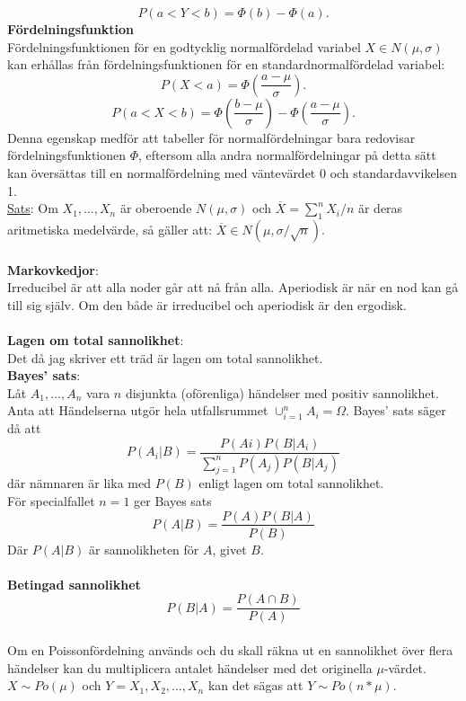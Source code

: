 \documentclass[8pt]{extarticle}
\begin{document}
\begin{multicols*}{2}
\begin{equation*}
P(a < Y < b) = \Phi (b) - \Phi (a).
\end{equation*}
\textbf{Fördelningsfunktion}\\
Fördelningsfunktionen för en godtycklig normalfördelad variabel $X \in N(\mu , \sigma)$  kan erhållas från fördelningsfunktionen för en standardnormalfördelad variabel:
\begin{equation*}
P(X < a) = \Phi \left(\frac{a - \mu}{\sigma}\right).
\end{equation*}
\begin{equation*}
P(a < X < b) = \Phi \left(\frac{b - \mu}{\sigma}\right) - \Phi \left(\frac{a - \mu}{\sigma}\right).
\end{equation*}
Denna egenskap medför att tabeller för normalfördelningar bara redovisar fördelningsfunktionen $\Phi$, eftersom alla andra normalfördelningar på detta sätt kan översättas till en normalfördelning med väntevärdet 0 och standardavvikelsen 1.\\
\underline{Sats}: Om $X_1, ... , X_n$ är oberoende $N(\mu,\sigma)$ och $\overline{X} = \sum_1^nX_i / n$ är deras aritmetiska medelvärde, så gäller att: $\overline{X} \in N(\mu, \sigma/\sqrt{n})$.\\
\\
\textbf{Markovkedjor}:\\
Irreducibel är att alla noder går att nå från alla. Aperiodisk är när en nod kan gå till sig själv. Om den både är irreducibel och aperiodisk är den ergodisk.\\
\\
\textbf{Lagen om total sannolikhet}:\\
Det då jag skriver ett träd är lagen om total sannolikhet.\\
\textbf{Bayes' sats}:\\
Låt $A_1, ... , A_n$ vara $n$ disjunkta (oförenliga) händelser med positiv sannolikhet. Anta att Händelserna utgör hela utfallsrummet $\cup_{i=1}^n A_i = \Omega$. Bayes' sats säger då att 
\begin{equation*}
P(A_i|B) = \frac{P(Ai)P(B|A_i)}{\sum_{j=1}^nP(A_j)P(B|A_j)}
\end{equation*}
där nämnaren är lika med $P(B)$ enligt lagen om total sannolikhet.\\
För specialfallet $n=1$ ger Bayes sats
\begin{equation*}
P(A|B)=\frac{P(A)P(B|A)}{P(B)}
\end{equation*}
Där $P(A|B)$ är sannolikheten för $A$, givet $B$.\\
\\
\textbf{Betingad sannolikhet}
\begin{equation*}
P(B|A) = \frac{P(A \cap B)}{P(A)}
\end{equation*}
\\
Om en Poissonfördelning används och du skall räkna ut en sannolikhet över flera händelser kan du multiplicera antalet händelser med det originella $\mu$-värdet.\\
$X \sim Po(\mu)$ och $Y = X_1,X_2,...,X_n$ kan det sägas att $Y \sim Po(n * \mu)$.


\end{multicols*}
\end{document}
